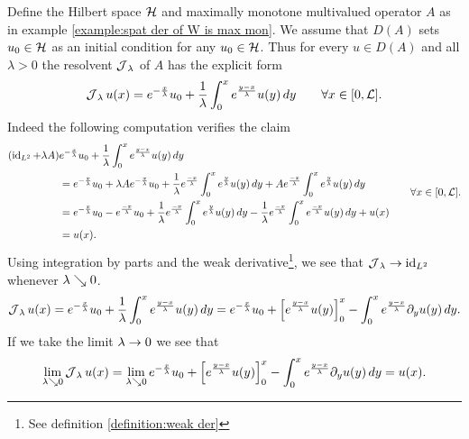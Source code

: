 \begin{example}\label{example:res of spat der of W}
	Define the Hilbert space $ \mathcal{H} $ and maximally monotone
	multivalued operator $ A $
	as in example \ref{example:spat der of W is max mon}.
	We assume that $ D(A) $ sets $ u_0\in\mathcal{H} $ as an initial condition
	for any $ u_0\in\mathcal{H} $. Thus for every $ u\in D(A) $ and all $ \lambda >0 $
	the resolvent $ \operatorname{\mathcal{J}}_\lambda $ of $ A $ has the explicit form
	\begin{align*}
		\operatorname{\mathcal{J}}_\lambda u(x)
		=e^{-\frac{x}{\lambda}}u_0
		+\frac{1}{\lambda}\int_0^x e^{\frac{y-x}{\lambda}} u(y)\,dy
		\qquad\forall x\in[0,\mathcal{L}].
	\end{align*}
	Indeed the following computation verifies the claim
	\begin{align*}
		\begin{split}
			(\operatorname{\mathrm{id}}_{L^2}+\lambda A)&
			e^{-\frac{x}{\lambda}}u_0
			+\frac{1}{\lambda}\int_0^x e^{\frac{y-x}{\lambda}} u(y)\,dy\\
			&=e^{-\frac{x}{\lambda}}u_0
			+\lambda A e^{-\frac{x}{\lambda}}u_0
			+\frac{1}{\lambda}e^{\frac{-x}{\lambda}}
			\int_0^x e^{\frac{y}{\lambda}} u(y)\,dy
			+A e^{\frac{-x}{\lambda}}\int_0^x e^{\frac{y}{\lambda}} u(y)\,dy\\
			&=e^{-\frac{x}{\lambda}}u_0
			-e^{\frac{-x}{\lambda}} u_0
			+\frac{1}{\lambda}e^{\frac{-x}{\lambda}}
			\int_0^x e^{\frac{y}{\lambda}} u(y)\,dy
			-\frac{1}{\lambda}e^{\frac{-x}{\lambda}}
			\int_0^x e^{\frac{-x}{\lambda}}u(y)\,dy
			+u(x)\\
			&=u(x).
		\end{split}
		\qquad\forall x\in[0,\mathcal{L}].
	\end{align*}
	Using integration by
	parts and the weak derivative\footnote{See 
		definition \ref{definition:weak der}},
	we see that $ \operatorname{\mathcal{J}}_\lambda\rightarrow\operatorname{\mathrm{id}}_{L^2} $ whenever $ \lambda\searrow 0 $.
	\begin{align*}
		\operatorname{\mathcal{J}}_\lambda u(x)
		=e^{-\frac{x}{\lambda}}u_0
		+\frac{1}{\lambda}\int_0^x e^{\frac{y-x}{\lambda}} u(y)\,dy
		=e^{-\frac{x}{\lambda}}u_0
		+\left[e^{\frac{y-x}{\lambda}} u(y)\right]_0^x
		-\int_0^x e^{\frac{y-x}{\lambda}} \partial_y u(y)\,dy.
	\end{align*}
	If we take the limit $ \lambda\rightarrow 0 $ we see that
	\begin{align*}
		\lim_{\lambda\searrow 0}\operatorname{\mathcal{J}}_\lambda u(x)
		=\lim_{\lambda\searrow 0} e^{-\frac{x}{\lambda}}u_0
		+\left[e^{\frac{y-x}{\lambda}} u(y)\right]_0^x
		-\int_0^x e^{\frac{y-x}{\lambda}} \partial_y u(y)\,dy
		=u(x).
	\end{align*}
\end{example}

